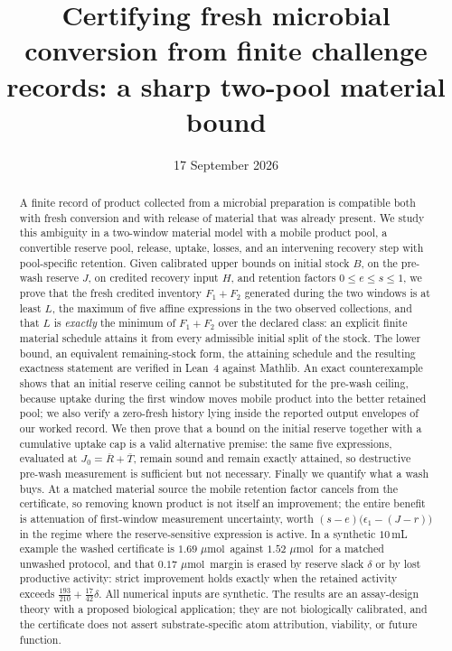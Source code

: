 \documentclass[11pt]{article}
\title{\bfseries Certifying fresh microbial conversion from finite challenge
records: a sharp two-pool material bound}
\author{}
\date{17 September 2026}
\theoremstyle{plain}
\theoremstyle{definition}
\theoremstyle{remark}
\newcommand{\mumol}{\ensuremath{\mu\mathrm{mol}}}
\newcommand{\Lc}{L}
\begin{document}
\maketitle

\begin{abstract}
A finite record of product collected from a microbial preparation is
compatible both with fresh conversion and with release of material that was
already present. We study this ambiguity in a two-window material model with
a mobile product pool, a convertible reserve pool, release, uptake, losses,
and an intervening recovery step with pool-specific retention. Given
calibrated upper bounds on initial stock $B$, on the pre-wash reserve $J$,
on credited recovery input $H$, and retention factors $0\le e\le s\le1$, we
prove that the fresh credited inventory $F_1+F_2$ generated during the two
windows is at least $\Lc$, the maximum of five affine expressions in the two
observed collections, and that $\Lc$ is \emph{exactly} the minimum of
$F_1+F_2$ over the declared class: an explicit finite material schedule
attains it from every admissible initial split of the stock. The lower
bound, an equivalent remaining-stock form, the attaining schedule and the
resulting exactness statement are verified in Lean~4 against Mathlib.
An exact counterexample shows that an initial reserve ceiling cannot be
substituted for the pre-wash ceiling, because uptake during the first window
moves mobile product into the better retained pool; we also verify a
zero-fresh history lying inside the reported output envelopes of our worked
record. We then prove that a bound on the initial reserve together with a
cumulative uptake cap is a valid alternative premise: the same five
expressions, evaluated at $J_0=\overline R+\overline T$, remain sound and
remain exactly attained, so destructive pre-wash measurement is sufficient
but not necessary.
Finally we quantify what a wash buys. At a matched material source the
mobile retention factor cancels from the certificate, so removing known
product is not itself an improvement; the entire benefit is attenuation of
first-window measurement uncertainty, worth $(s-e)\bigl(\epsilon_1-(J-r)\bigr)$
in the regime where the reserve-sensitive expression is active. In a
synthetic $10\,$mL example the washed certificate is $1.69$ \mumol\ against
$1.52$ \mumol\ for a matched unwashed protocol, and that $0.17$ \mumol\
margin is erased by reserve slack $\delta$ or by lost productive activity:
strict improvement holds exactly when the retained activity exceeds
$\tfrac{193}{210}+\tfrac{17}{42}\delta$. All numerical inputs are synthetic.
The results are an assay-design theory with a proposed biological
application; they are not biologically calibrated, and the certificate does
not assert substrate-specific atom attribution, viability, or future
function.
\end{abstract}
\end{document}
